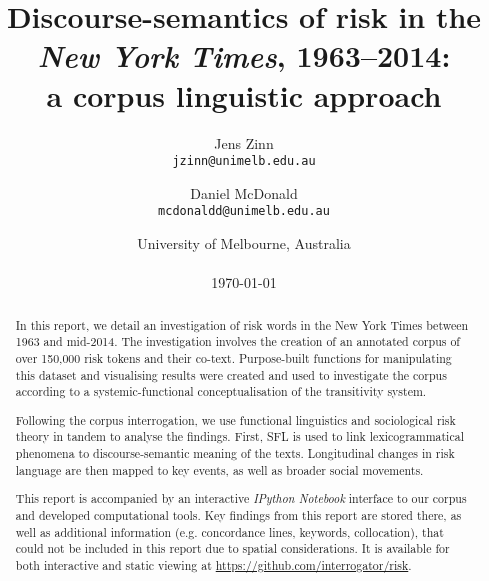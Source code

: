 \documentclass{report}
\title{Discourse-semantics of risk in the \emph{New York Times}, 1963--2014: \\ a corpus linguistic approach}
\author{
	Jens Zinn\\
	\texttt{jzinn@unimelb.edu.au}
	\and
	Daniel McDonald\\
	\texttt{mcdonaldd@unimelb.edu.au}\\
	}
\date{University of Melbourne, Australia\\
	~\\
	\today}
\begin{document}
		

	\renewcommand{\abstractname}{Summary}

	\maketitle

\begin{abstract}

	\noindent In this report, we detail an investigation of risk words in the New York Times between 1963 and mid-2014. The investigation involves the creation of an annotated corpus of over 150,000 risk tokens and their co-text. Purpose-built functions for manipulating this dataset and visualising results were created and used to investigate the corpus according to a systemic-functional conceptualisation of the transitivity system.

    Following the corpus interrogation, we use functional linguistics and sociological risk theory in tandem to analyse the findings. First, SFL is used to link lexicogrammatical phenomena to discourse-semantic meaning of the texts. Longitudinal changes in risk language are then mapped to key events, as well as broader social movements.

    This report is accompanied by an interactive \emph{IPython Notebook} interface to our corpus and developed computational tools. Key findings from this report are stored there, as well as additional information (e.g. concordance lines, keywords, collocation), that could not be included in this report due to spatial considerations. %
    It is available for both interactive and static viewing at \url{https://github.com/interrogator/risk}.

	\end{abstract}
	\cleardoublepage
	\singlespacing
	\tableofcontents
	\onehalfspacing
	\cleardoublepage



\end{document}
